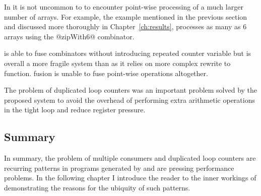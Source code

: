 \documentclass[preamble.tex]{subfiles}
\begin{document}
In \DPH\idph it is not uncommon to to encounter point-wise processing of a much larger number of arrays. For example, the \QuickHull example mentioned in the previous section and discussed more thoroughly in Chapter~\ref{ch:results}, processes as many as 6 arrays using the @zipWith6@ combinator.

\ifaf is able to fuse  combinators without introducing repeated counter variable but is overall a more fragile system than \StreamFusion as it relies on more complex rewrite to function. \ishortcut fusion is unable to fuse point-wise operations altogether.

The problem of duplicated loop counters was an important problem solved by the proposed \LiveFusion system to avoid the overhead of performing extra arithmetic operations in the tight loop and reduce register pressure.



\subsection{Summary}

In summary, the problem of multiple consumers and duplicated loop counters are recurring patterns in programs generated by  and are pressing performance problems. In the following chapter I introduce the reader to the inner workings of  demonstrating the reasons for the ubiquity of such patterns.


\IfNotCompilingAll{\printbibliography}
\end{document}

